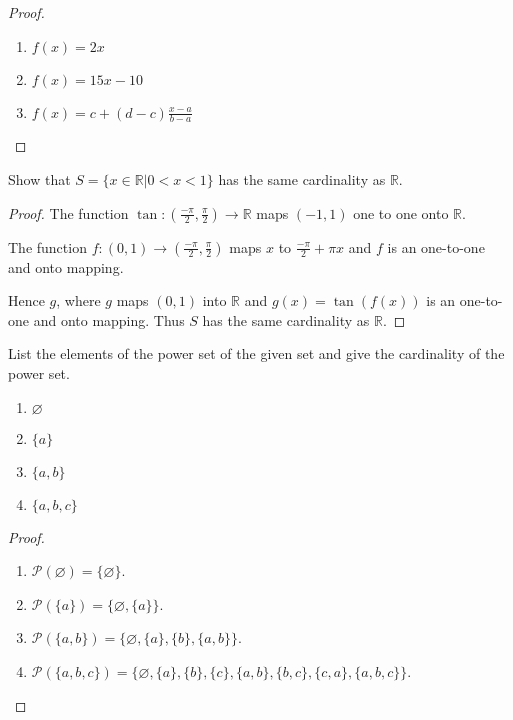 \begin{proof}
    \begin{enumerate}[label={\textbf{\alph*.}},itemsep=0pt]
        \item $f(x) = 2x$
        \item $f(x) = 15x - 10$
        \item $f(x) = c + (d-c)\frac{x-a}{b-a}$
    \end{enumerate}
\end{proof}

\begin{exercise}
    Show that $S = \{ x\in\mathbb{R} \vert 0 < x < 1 \}$ has the same cardinality as $\mathbb{R}$.
\end{exercise}

\begin{proof}
    The function $\tan: \left(\frac{-\pi}{2}, \frac{\pi}{2}\right) \to \mathbb{R}$ maps $(-1, 1)$ one to one onto $\mathbb{R}$.

    The function $f: (0, 1) \to \left(\frac{-\pi}{2}, \frac{\pi}{2}\right)$ maps $x$ to $\frac{-\pi}{2} + \pi x$ and $f$ is an one-to-one and onto mapping.

    Hence $g$, where $g$ maps $(0, 1)$ into $\mathbb{R}$ and $g(x) = \tan(f(x))$ is an one-to-one and onto mapping. Thus $S$ has the same cardinality as $\mathbb{R}$.
\end{proof}

\begin{exercise}
    List the elements of the power set of the given set and give the cardinality of the power set.
    \begin{enumerate}[label={\textbf{\alph*.}}]
        \item $\varnothing$
        \item $\{ a \}$
        \item $\{ a, b \}$
        \item $\{ a, b, c \}$
    \end{enumerate}
\end{exercise}

\begin{proof}
    \begin{enumerate}[label={\textbf{\alph*.}}]
        \item $\mathscr{P}(\varnothing) = \{ \varnothing \}$.
        \item $\mathscr{P}(\{ a \}) = \{ \varnothing, \{ a \} \}$.
        \item $\mathscr{P}(\{ a, b \}) = \{ \varnothing, \{ a \}, \{ b \}, \{ a, b \} \}$.
        \item $\mathscr{P}(\{ a, b, c \}) = \{ \varnothing, \{ a \}, \{ b \}, \{ c \}, \{ a, b \}, \{ b, c \}, \{ c, a \}, \{ a, b, c \} \}$.
    \end{enumerate}
\end{proof}

